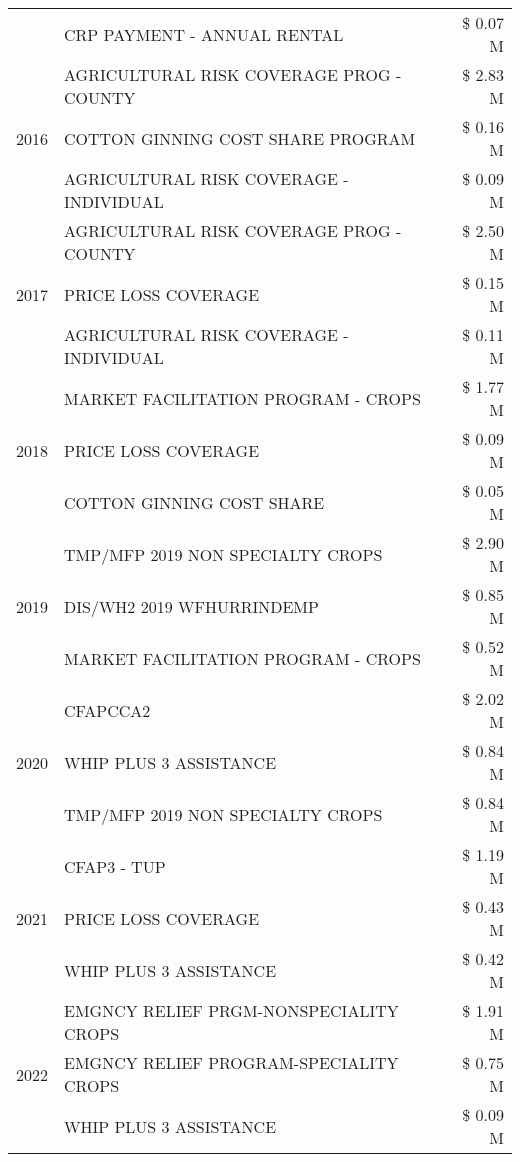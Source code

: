 \begin{tabular}{llr}
 & CRP PAYMENT - ANNUAL RENTAL & \$ 0.07 M \\
\cline{1-3}
\multirow[t]{3}{*}{2016} & AGRICULTURAL RISK COVERAGE PROG - COUNTY & \$ 2.83 M \\
 & COTTON GINNING COST SHARE PROGRAM & \$ 0.16 M \\
 & AGRICULTURAL RISK COVERAGE - INDIVIDUAL & \$ 0.09 M \\
\cline{1-3}
\multirow[t]{3}{*}{2017} & AGRICULTURAL RISK COVERAGE PROG - COUNTY & \$ 2.50 M \\
 & PRICE LOSS COVERAGE & \$ 0.15 M \\
 & AGRICULTURAL RISK COVERAGE - INDIVIDUAL & \$ 0.11 M \\
\cline{1-3}
\multirow[t]{3}{*}{2018} & MARKET FACILITATION PROGRAM - CROPS & \$ 1.77 M \\
 & PRICE LOSS COVERAGE & \$ 0.09 M \\
 & COTTON GINNING COST SHARE & \$ 0.05 M \\
\cline{1-3}
\multirow[t]{3}{*}{2019} & TMP/MFP 2019 NON SPECIALTY CROPS & \$ 2.90 M \\
 & DIS/WH2 2019 WFHURRINDEMP & \$ 0.85 M \\
 & MARKET FACILITATION PROGRAM - CROPS & \$ 0.52 M \\
\cline{1-3}
\multirow[t]{3}{*}{2020} & CFAPCCA2 & \$ 2.02 M \\
 & WHIP PLUS 3 ASSISTANCE & \$ 0.84 M \\
 & TMP/MFP 2019 NON SPECIALTY CROPS & \$ 0.84 M \\
\cline{1-3}
\multirow[t]{3}{*}{2021} & CFAP3 - TUP & \$ 1.19 M \\
 & PRICE LOSS COVERAGE & \$ 0.43 M \\
 & WHIP PLUS 3 ASSISTANCE & \$ 0.42 M \\
\cline{1-3}
\multirow[t]{3}{*}{2022} & EMGNCY RELIEF PRGM-NONSPECIALITY CROPS & \$ 1.91 M \\
 & EMGNCY RELIEF PROGRAM-SPECIALITY CROPS & \$ 0.75 M \\
 & WHIP PLUS 3 ASSISTANCE & \$ 0.09 M \\
\cline{1-3}
\bottomrule
\end{tabular}
